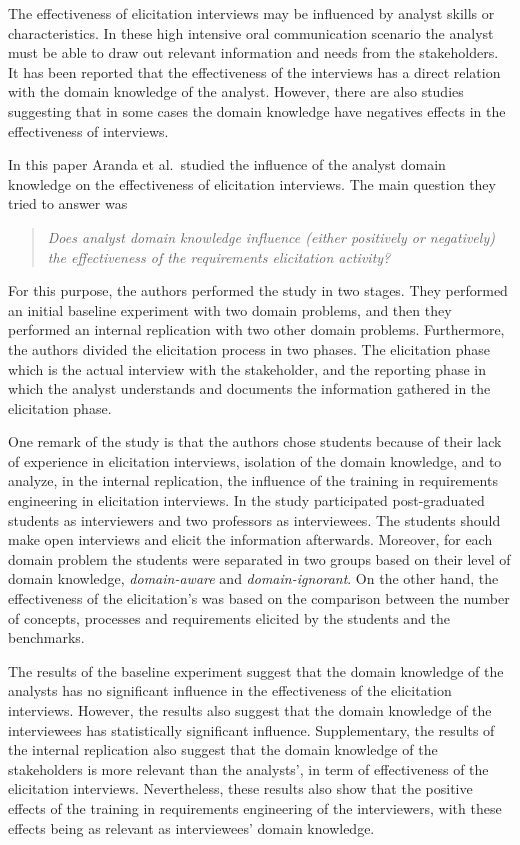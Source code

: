 \documentclass[]{llncs}
\begin{document}
The effectiveness of elicitation interviews may be influenced by analyst
skills or characteristics. In these high intensive oral communication
scenario the analyst must be able to draw out relevant information and
needs from the stakeholders. It has been reported that the effectiveness
of the interviews has a direct relation with the domain knowledge of the
analyst. However, there are also studies suggesting that in some cases
the domain knowledge have negatives effects in the effectiveness of
interviews.

In this paper Aranda et al.~studied the influence of the analyst domain
knowledge on the effectiveness of elicitation interviews. The main
question they tried to answer was

\begin{quote}
\emph{Does analyst domain knowledge influence (either positively or
negatively) the effectiveness of the requirements elicitation activity?}
\end{quote}

For this purpose, the authors performed the study in two stages. They
performed an initial baseline experiment with two domain problems, and
then they performed an internal replication with two other domain
problems. Furthermore, the authors divided the elicitation process in
two phases. The elicitation phase which is the actual interview with the
stakeholder, and the reporting phase in which the analyst understands
and documents the information gathered in the elicitation phase.

One remark of the study is that the authors chose students because of
their lack of experience in elicitation interviews, isolation of the
domain knowledge, and to analyze, in the internal replication, the
influence of the training in requirements engineering in elicitation
interviews. In the study participated post-graduated students as
interviewers and two professors as interviewees. The students should
make open interviews and elicit the information afterwards. Moreover,
for each domain problem the students were separated in two groups based
on their level of domain knowledge, \emph{domain-aware} and
\emph{domain-ignorant}. On the other hand, the effectiveness of the
elicitation's was based on the comparison between the number of
concepts, processes and requirements elicited by the students and the
benchmarks.

The results of the baseline experiment suggest that the domain knowledge
of the analysts has no significant influence in the effectiveness of the
elicitation interviews. However, the results also suggest that the
domain knowledge of the interviewees has statistically significant
influence. Supplementary, the results of the internal replication also
suggest that the domain knowledge of the stakeholders is more relevant
than the analysts', in term of effectiveness of the elicitation
interviews. Nevertheless, these results also show that the positive
effects of the training in requirements engineering of the interviewers,
with these effects being as relevant as interviewees' domain knowledge.
\end{document}
